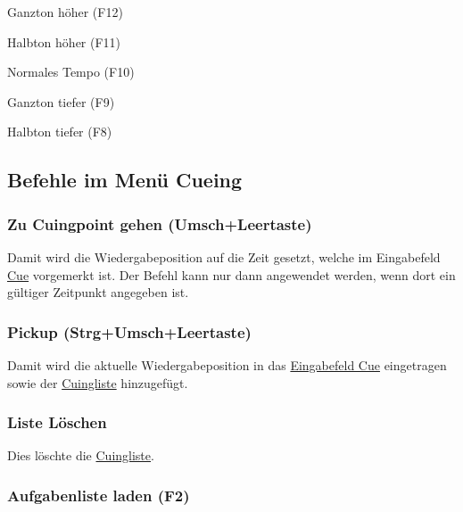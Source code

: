 \documentclass[a4paper,DIV=11
]{scrartcl}
\begin{document}
\begin{itemize*}
\item
  Ganzton höher (F12)
\item
  Halbton höher (F11)
\item
  Normales Tempo (F10)
\item
  Ganzton tiefer (F9)
\item
  Halbton tiefer (F8)
\end{itemize*}

\hypertarget{befehle-im-menuxfc-cueing}{%
\subsection{Befehle im Menü Cueing}\label{befehle-im-menuxfc-cueing}}

\hypertarget{zu-cuingpoint-gehen-umschleertaste}{%
\subsubsection{Zu Cuingpoint gehen
(Umsch+Leertaste)}\label{zu-cuingpoint-gehen-umschleertaste}}

Damit wird die Wiedergabeposition auf die Zeit gesetzt, welche im
Eingabefeld \protect\hyperlink{EingabefeldCue}{Cue} vorgemerkt ist. Der
Befehl kann nur dann angewendet werden, wenn dort ein gültiger Zeitpunkt
angegeben ist.

\hypertarget{pickup-strgumschleertaste}{%
\subsubsection{Pickup
(Strg+Umsch+Leertaste)}\label{pickup-strgumschleertaste}}

Damit wird die aktuelle Wiedergabeposition in das
\protect\hyperlink{EingabefeldCue}{Eingabefeld Cue} eingetragen sowie
der \protect\hyperlink{Cuingliste}{Cuingliste} hinzugefügt.

\hypertarget{liste-luxf6schen}{%
\subsubsection{Liste Löschen}\label{liste-luxf6schen}}

Dies löschte die \protect\hyperlink{Cuingliste}{Cuingliste}.

\hypertarget{aufgabenliste-laden-f2}{%
\subsubsection{Aufgabenliste laden (F2)}\label{aufgabenliste-laden-f2}}
\end{document}
